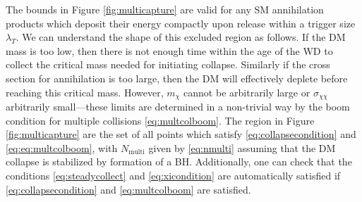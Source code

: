 \documentclass[preprintnumbers,amsmath,amssymb,prd,superscriptaddress]{revtex4}
\begin{document}
The bounds in Figure \ref{fig:multicapture} are valid for any SM annihilation products which deposit their energy compactly upon release within a trigger size $\lambda_T$.
We can understand the shape of this excluded region as follows.
If the DM mass is too low, then there is not enough time within the age of the WD to collect the critical mass needed for initiating collapse.
Similarly if the cross section for annihilation is too large, then the DM will effectively deplete before reaching this critical mass. 
However, $m_\chi$ cannot be arbitrarily large or $\sigma_{\chi \chi}$ arbitrarily small---these limits are determined in a non-trivial way by the boom condition for multiple collisions \eqref{eq:multcolboom}. 
The region in Figure \ref{fig:multicapture} are the set of all points which satisfy \eqref{eq:collapsecondition} and \eqref{eq:eq:multcolboom}, with $N_\text{multi}$ given by \eqref{eq:nmulti} assuming that the DM collapse is stabilized by formation of a BH. 
Additionally, one can check that the conditions \eqref{eq:steadycollect} and \eqref{eq:xicondition} are automatically satisfied if \eqref{eq:collapsecondition} and \eqref{eq:multcolboom} are satisfied. 
\end{document}
